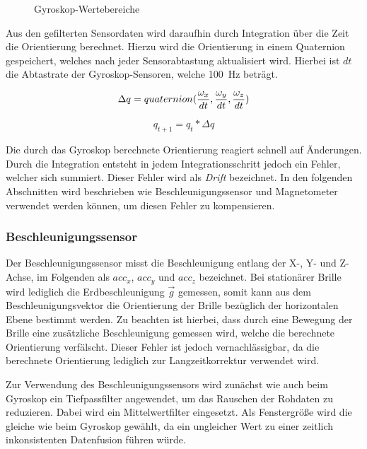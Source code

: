 \begin{figure}[h]
    \centering
    \def\svgwidth{0.4\textwidth}
    
    \caption{Gyroskop-Wertebereiche}
    \label{fig:gyro_threshold}
\end{figure}

Aus den gefilterten Sensordaten wird daraufhin durch Integration über
die Zeit die Orientierung berechnet. Hierzu wird die Orientierung in einem Quaternion gespeichert, welches nach jeder Sensorabtastung aktualisiert wird. Hierbei ist $dt$ die Abtastrate der Gyroskop-Sensoren, welche 100~Hz beträgt.

\begin{equation}
    \Delta q = quaternion({\omega_x \over dt}, {\omega_y \over dt}, {\omega_z \over dt}) \\
\end{equation}

\begin{equation}
    q_{t+1} = q_t * \Delta q
\end{equation}

Die durch das Gyroskop berechnete Orientierung reagiert schnell auf
Änderungen. Durch die Integration entsteht in jedem Integrationsschritt jedoch ein Fehler, welcher sich summiert. Dieser Fehler wird als \emph{Drift} bezeichnet. In den folgenden Abschnitten wird beschrieben wie Beschleunigungssensor und Magnetometer verwendet werden können, um diesen Fehler zu kompensieren.



\subsubsection{Beschleunigungssensor}


Der Beschleunigungssensor misst die Beschleunigung entlang der X-, Y-
und Z-Achse, im Folgenden als $acc_x$, $acc_y$ und $acc_z$ bezeichnet.
Bei stationärer Brille wird lediglich die Erdbeschleunigung $\vec g$
gemessen, somit kann aus dem Beschleunigungsvektor die Orientierung der
Brille bezüglich der horizontalen Ebene bestimmt werden. Zu beachten
ist hierbei, dass durch eine Bewegung der Brille eine zusätzliche
Beschleunigung gemessen wird, welche die berechnete Orientierung
verfälscht. Dieser Fehler ist jedoch vernachlässigbar, da die berechnete
Orientierung lediglich zur Langzeitkorrektur verwendet wird.


Zur Verwendung des Beschleunigungssensors wird zunächst wie auch beim
Gyroskop ein Tiefpassfilter angewendet, um das Rauschen der Rohdaten zu
reduzieren.
Dabei wird ein Mittelwertfilter eingesetzt.
Als Fenstergröße wird die gleiche wie beim Gyroskop gewählt, da ein ungleicher Wert zu einer zeitlich inkonsistenten Datenfusion führen würde.

